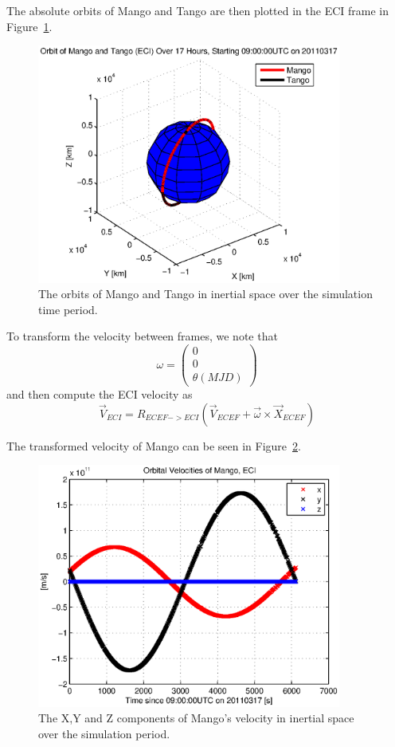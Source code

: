 \documentclass{article}
\begin{document}
The absolute orbits of Mango and Tango are then plotted in the ECI frame in Figure~\ref{fig:ECI}.

\begin{figure}[H]
    \centering
    \includegraphics[width=10cm]{ECI_orbit.eps}
    \caption{The orbits of Mango and Tango in inertial space over the simulation time period.}
    \label{fig:ECI}
\end{figure}

To transform the velocity between frames, we note that
\[\omega = \begin{pmatrix}
                    0\\
                    0\\
                    \theta(MJD) 
            \end{pmatrix} \]
and then compute the ECI velocity as
\[\vec{V}_{ECI} = R_{ECEF->ECI}(\vec{V}_{ECEF} + \vec{\omega} \times \vec{X}_{ECEF}) \]

The transformed velocity of Mango can be seen in Figure~\ref{fig:vel}.
\begin{figure}[H]
    \centering
    \includegraphics[width=10cm]{mainVelocity.eps}
    \caption{The X,Y and Z components of Mango's velocity in inertial space over the simulation period.}
    \label{fig:vel}
\end{figure}
\end{document}
